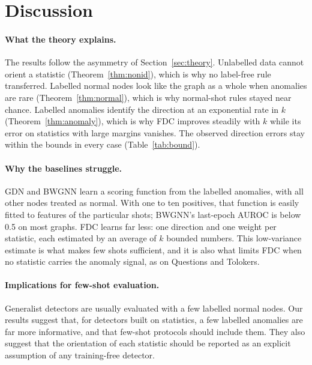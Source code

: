 \documentclass[pdflatex,sn-mathphys-ay]{sn-jnl}
\theoremstyle{plain}
\theoremstyle{remark}
\begin{document}
\section{Discussion}\label{sec:discussion}

\paragraph{What the theory explains.} The results follow the asymmetry of Section~\ref{sec:theory}. Unlabelled data cannot orient a statistic (Theorem~\ref{thm:nonid}), which is why no label-free rule transferred. Labelled normal nodes look like the graph as a whole when anomalies are rare (Theorem~\ref{thm:normal}), which is why normal-shot rules stayed near chance. Labelled anomalies identify the direction at an exponential rate in $k$ (Theorem~\ref{thm:anomaly}), which is why FDC improves steadily with $k$ while its error on statistics with large margins vanishes. The observed direction errors stay within the bounds in every case (Table~\ref{tab:bound}).

\paragraph{Why the baselines struggle.} GDN and BWGNN learn a scoring function from the labelled anomalies, with all other nodes treated as normal. With one to ten positives, that function is easily fitted to features of the particular shots; BWGNN's last-epoch AUROC is below 0.5 on most graphs. FDC learns far less: one direction and one weight per statistic, each estimated by an average of $k$ bounded numbers. This low-variance estimate is what makes few shots sufficient, and it is also what limits FDC when no statistic carries the anomaly signal, as on Questions and Tolokers.

\paragraph{Implications for few-shot evaluation.} Generalist detectors are usually evaluated with a few labelled normal nodes. Our results suggest that, for detectors built on statistics, a few labelled anomalies are far more informative, and that few-shot protocols should include them. They also suggest that the orientation of each statistic should be reported as an explicit assumption of any training-free detector.
\end{document}
